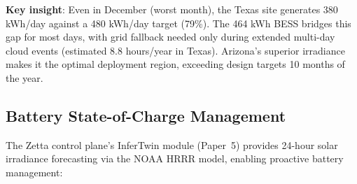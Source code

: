 \documentclass[conference,10pt,letterpaper]{IEEEtran}
\begin{document}
\begin{table}[!t]
\caption{Monthly Solar Generation Variability (Edge SKU, 120 kWp)}
\label{tab:seasonal}
\centering\scriptsize
{}
\end{table}

\textbf{Key insight}: Even in December (worst month), the Texas site generates 380 kWh/day against a 480 kWh/day target (79\%). The 464 kWh BESS bridges this gap for most days, with grid fallback needed only during extended multi-day cloud events (estimated 8.8 hours/year in Texas). Arizona's superior irradiance makes it the optimal deployment region, exceeding design targets 10 months of the year.

\subsection{Battery State-of-Charge Management}

The Zetta control plane's InferTwin module (Paper~5) provides 24-hour solar irradiance forecasting via the NOAA HRRR model, enabling proactive battery management:
\end{document}
